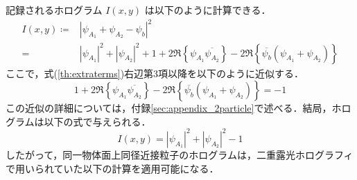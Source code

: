 記録されるホログラム $I(x,y)$ は以下のように計算できる．
\begin{align}
    I(x,y) \coloneqq& \left|\psi_{A_1} + \psi_{A_2} - \psi_b \right|^2 \\
    \label{th:extraterms}
    =& |\psi_{A_1}|^2 + |\psi_{A_2}|^2 + 1 + 2\Re \left\{ \psi_{A_1} \overline{\psi_{A_2}} \right\} - 2\Re \left\{\overline{\psi_b}\left( \psi_{A_1} + \psi_{A_2} \right)\right\}
\end{align}
ここで，式(\ref{th:extraterms})右辺第3項以降を以下のように近似する．
\begin{equation}
    1 + 2\Re \left\{ \psi_{A_1} \overline{\psi_{A_2}} \right\} - 2\Re \left\{\overline{\psi_b}\left( \psi_{A_1} + \psi_{A_2} \right)\right\} = -1
\end{equation}
この近似の詳細については，付録\ref{sec:appendix_2particle}で述べる．結局，ホログラムは以下の式で与えられる．
\begin{equation}
    \label{th:2particleHologram}
    I(x,y) = |\psi_{A_1}|^2 + |\psi_{A_2}|^2 - 1
\end{equation}
したがって，同一物体面上同径近接粒子のホログラムは，二重露光ホログラフィで用いられていた以下の計算を適用可能になる\cite{doubleexposure}．

